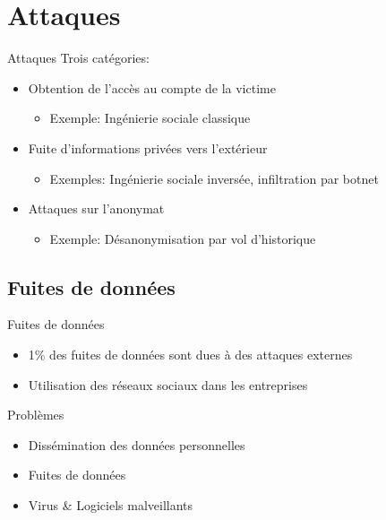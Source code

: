 \section{Attaques}

\begin{frame}{Attaques}
    Trois catégories:
    \begin{itemize}
        \item Obtention de l'accès au compte de la victime
            \begin{itemize}
                \item Exemple: Ingénierie sociale classique
            \end{itemize}
        \item Fuite d'informations privées vers l'extérieur
            \begin{itemize}
                \item Exemples: Ingénierie sociale inversée, infiltration par
                    botnet
            \end{itemize}
        \item Attaques sur l'anonymat
            \begin{itemize}
                \item Exemple: Désanonymisation par vol d'historique
            \end{itemize}
    \end{itemize}
\end{frame}

\subsection{Fuites de données}
\begin{frame}{Fuites de données}
\begin{itemize}
\item 1\% des fuites de données sont dues à des attaques externes
\item Utilisation des réseaux sociaux dans les entreprises
\end{itemize}
\begin{block}{Problèmes}
\begin{itemize}
\item Dissémination des données personnelles
\item Fuites de données
\item Virus \& Logiciels malveillants
\end{itemize}
\end{block}
\end{frame}


